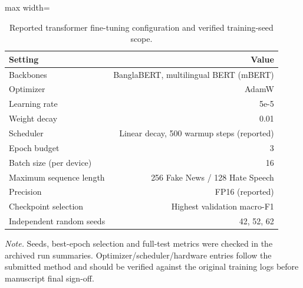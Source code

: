 \begin{table}[t]
\centering
\caption{Reported transformer fine-tuning configuration and verified training-seed scope.}
\label{tab:hyper}
\footnotesize
\begin{adjustbox}{max width=\linewidth}
\begin{tabular}{lr}
\toprule
Setting & Value \\
\midrule
Backbones & BanglaBERT, multilingual BERT (mBERT) \\
Optimizer & AdamW \\
Learning rate & 5e-5 \\
Weight decay & 0.01 \\
Scheduler & Linear decay, 500 warmup steps (reported) \\
Epoch budget & 3 \\
Batch size (per device) & 16 \\
Maximum sequence length & 256 Fake News / 128 Hate Speech \\
Precision & FP16 (reported) \\
Checkpoint selection & Highest validation macro-F1 \\
Independent random seeds & 42, 52, 62 \\
\bottomrule
\end{tabular}
\end{adjustbox}
\par\vspace{2pt}
\begin{minipage}{\linewidth}
\scriptsize\emph{Note.} Seeds, best-epoch selection and full-test metrics were checked in the archived run summaries. Optimizer/scheduler/hardware entries follow the submitted method and should be verified against the original training logs before manuscript final sign-off.
\end{minipage}
\end{table}
